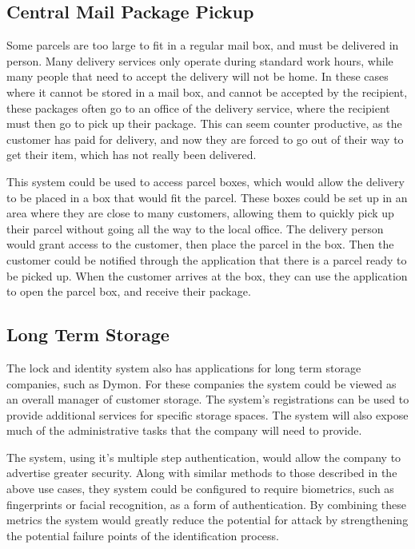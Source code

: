 \documentclass{article}
\begin{document}
\subsection{Central Mail Package Pickup}

Some parcels are too large to fit in a regular mail box, and must be delivered in person. Many delivery services only 
operate during standard work hours, while many people that need to accept the delivery will not be home. In these cases 
where it cannot be stored in a mail box, and cannot be accepted by the recipient, these packages often go to an office 
of the delivery service, where the recipient must then go to pick up their package. This can seem counter productive, 
as the customer has paid for delivery, and now they are forced to go out of their way to get their item, which has not 
really been delivered.

This system could be used to access parcel boxes, which would allow the delivery to be placed in a box that would fit 
the parcel. These boxes could be set up in an area where they are close to many customers, allowing them to quickly 
pick up their parcel without going all the way to the local office. The delivery person would grant access to the 
customer, then place the parcel in the box. Then the customer could be notified through the application that there is a 
parcel ready to be picked up. When the customer arrives at the box, they can use the application to open the parcel 
box, and receive their package.

\subsection{Long Term Storage}

The lock and identity system also has applications for long term storage companies, such as Dymon. For these companies
the system could be viewed as an overall manager of customer storage. The system's registrations can be used to provide
additional services for specific storage spaces. The system will also expose much of the administrative tasks that the
company will need to provide.

The system, using it's multiple step authentication, would allow the company to advertise greater security. Along with
similar methods to those described in the above use cases, they system could be configured to require biometrics, such
as fingerprints or facial recognition, as a form of authentication. By combining these metrics the system would greatly
reduce the potential for attack by strengthening the potential failure points of the identification process.
\end{document}
